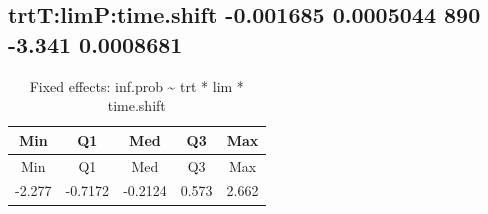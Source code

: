 \documentclass[]{article}
\begin{document}
\subsection{\texorpdfstring{\textbf{trtT:limP:time.shift} -0.001685
0.0005044 890 -3.341
0.0008681}{trtT:limP:time.shift -0.001685 0.0005044 890 -3.341 0.0008681}}\label{trttlimptime.shift--0.001685-0.0005044-890--3.341-0.0008681}

\begin{longtable}[]{@{}ccccc@{}}
\caption{Fixed effects: inf.prob \textasciitilde{} trt * lim *
time.shift}\tabularnewline
\toprule
\begin{minipage}[b]{0.08\columnwidth}\centering\strut
Min\strut
\end{minipage} & \begin{minipage}[b]{0.10\columnwidth}\centering\strut
Q1\strut
\end{minipage} & \begin{minipage}[b]{0.10\columnwidth}\centering\strut
Med\strut
\end{minipage} & \begin{minipage}[b]{0.07\columnwidth}\centering\strut
Q3\strut
\end{minipage} & \begin{minipage}[b]{0.07\columnwidth}\centering\strut
Max\strut
\end{minipage}\tabularnewline
\midrule
\endfirsthead
\toprule
\begin{minipage}[b]{0.08\columnwidth}\centering\strut
Min\strut
\end{minipage} & \begin{minipage}[b]{0.10\columnwidth}\centering\strut
Q1\strut
\end{minipage} & \begin{minipage}[b]{0.10\columnwidth}\centering\strut
Med\strut
\end{minipage} & \begin{minipage}[b]{0.07\columnwidth}\centering\strut
Q3\strut
\end{minipage} & \begin{minipage}[b]{0.07\columnwidth}\centering\strut
Max\strut
\end{minipage}\tabularnewline
\midrule
\endhead
\begin{minipage}[t]{0.08\columnwidth}\centering\strut
-2.277\strut
\end{minipage} & \begin{minipage}[t]{0.10\columnwidth}\centering\strut
-0.7172\strut
\end{minipage} & \begin{minipage}[t]{0.10\columnwidth}\centering\strut
-0.2124\strut
\end{minipage} & \begin{minipage}[t]{0.07\columnwidth}\centering\strut
0.573\strut
\end{minipage} & \begin{minipage}[t]{0.07\columnwidth}\centering\strut
2.662\strut
\end{minipage}\tabularnewline
\bottomrule
\end{longtable}
\end{document}
